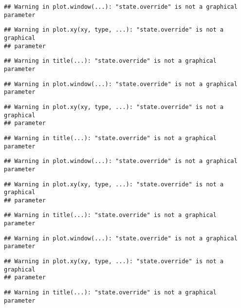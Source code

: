 \documentclass[]{book}
\theoremstyle{definition}
\theoremstyle{definition}
\theoremstyle{definition}
\theoremstyle{remark}
\begin{document}
\begin{verbatim}
## Warning in plot.window(...): "state.override" is not a graphical parameter
\end{verbatim}

\begin{verbatim}
## Warning in plot.xy(xy, type, ...): "state.override" is not a graphical
## parameter
\end{verbatim}

\begin{verbatim}
## Warning in title(...): "state.override" is not a graphical parameter
\end{verbatim}

\begin{verbatim}
## Warning in plot.window(...): "state.override" is not a graphical parameter
\end{verbatim}

\begin{verbatim}
## Warning in plot.xy(xy, type, ...): "state.override" is not a graphical
## parameter
\end{verbatim}

\begin{verbatim}
## Warning in title(...): "state.override" is not a graphical parameter
\end{verbatim}

\begin{verbatim}
## Warning in plot.window(...): "state.override" is not a graphical parameter
\end{verbatim}

\begin{verbatim}
## Warning in plot.xy(xy, type, ...): "state.override" is not a graphical
## parameter
\end{verbatim}

\begin{verbatim}
## Warning in title(...): "state.override" is not a graphical parameter
\end{verbatim}

\begin{verbatim}
## Warning in plot.window(...): "state.override" is not a graphical parameter
\end{verbatim}

\begin{verbatim}
## Warning in plot.xy(xy, type, ...): "state.override" is not a graphical
## parameter
\end{verbatim}

\begin{verbatim}
## Warning in title(...): "state.override" is not a graphical parameter
\end{verbatim}
\end{document}
